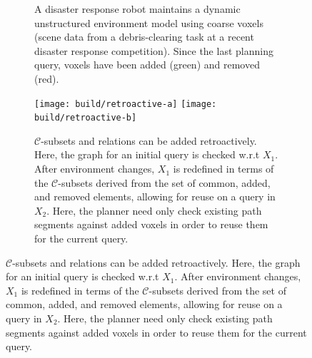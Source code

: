 \documentclass{report}
\begin{document}
\begin{figure}
\centering

\begin{subfigure}[b]{\linewidth}
\centering
{}
\caption{A disaster response robot maintains a
  dynamic unstructured environment model
  using coarse voxels
  (scene data from a debris-clearing task at a
  recent disaster response competition).
  Since the last planning query,
  voxels have been added (green) and removed (red).}
\label{fig:chimp-voxels-delta}
\end{subfigure}

\vspace{0.1in}

\begin{subfigure}[b]{\linewidth}
\centering
\texttt{[image: build/retroactive-a]}
\texttt{[image: build/retroactive-b]}
\caption{
  $\mathcal{C}$-subsets and relations
  can be added retroactively.
  Here, the graph for an initial query is checked w.r.t $X_1$.
  After environment changes,
  $X_1$ is redefined in terms of the $\mathcal{C}$-subsets
  derived from the set of common, added, and removed elements,
  allowing for reuse on a query in $X_2$.
  Here,
  the planner need only check existing path segments
  against added voxels in order to reuse them for the current query.}
\label{fig:retroactive}
\end{subfigure}


\end{figure}
\end{document}
